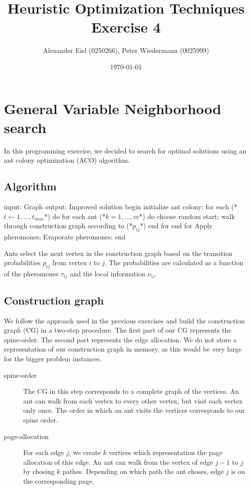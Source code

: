 \documentclass{scrartcl}
\author{Alexander Eisl (0250266), Peter Wiedermann (0025999)}
\date{\today}
\title{Heuristic Optimization Techniques \\ Exercise 4}
\begin{document}
\maketitle


\section{General Variable Neighborhood search}
\label{sec:general_vns}

In this programming exercise, we decided to search for optimal
solutions using an ant colony optimization (ACO) algorithm.


\subsection{Algorithm}

\begin{algorithm}[caption={Local search}]
    input: Graph 
    output: Improved solution
    begin
        initialize ant colony;
        for each (*$t \leftarrow 1,...,t_{max}$*) do
      	    for each ant (*$k = 1,...,m$*) do
               choose random start;
               walk through construction graph according to (*$p_{ij}$*)
            end for
        end for
        Apply pheromones;
        Evaporate pheromones;
    end
\end{algorithm}

Ants select the next vertex in the construction graph based on the
transition probabilities $p_{ij}$ from vertex $i$ to $j$. The
probabilities are calculated as a function of the pheromones
$\tau_{ij}$ and the local information $\nu_{ij}$.



\subsection{Construction graph}
\label{construction_graph}
We follow the approach used in the previous exercises and build the
construction graph (CG) in a two-step procedure. The first part of our
CG represents the spine-order. The second part represents the edge
allocation. We do not store a representation of our construction graph
in memory, as this would be very large for the bigger problem
instances.

\begin{description}
  \item[spine-order] The CG in this step corresponds to a complete
    graph of the vertices. An ant can walk from each vertex to every other vertex, but
    visit each vertex only once. The order in which an ant visits the vertices
    corresponds to our spine order.

  \item[page-allocation] For each edge $j$, we create $k$ vertices
    which representation the page allocation of this edge. An ant can
    walk from the vertex of edge $j-1$ to $j$ by chosing $k$
    pathes. Depending on which path the ant choses, edge $j$ is on the
    corresponding page.
\end{description}
\end{document}

